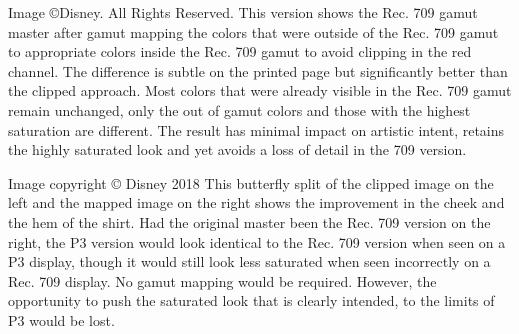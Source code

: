 Image ©Disney. All Rights Reserved.
This version shows the Rec. 709 gamut master after gamut mapping the colors that were outside of the Rec. 709 gamut to appropriate colors inside the Rec. 709 gamut to avoid clipping in the red channel. The difference is subtle on the printed page but significantly better than the clipped approach. Most colors that were already visible in the Rec. 709 gamut remain unchanged, only the out of gamut colors and those with the highest saturation are different. The result has minimal impact on artistic intent, retains the highly saturated look and yet avoids a loss of detail in the 709 version. 


Image copyright © Disney 2018
This butterfly split of the clipped image on the left and the mapped image on the right shows the improvement in the cheek and the hem of the shirt. Had the original master been the Rec. 709 version on the right, the P3 version would look identical to the Rec. 709 version when seen on a P3 display, though it would still look less saturated when seen incorrectly on a Rec. 709 display. No gamut mapping would be required. However, the opportunity to push the saturated look that is clearly intended, to the limits of P3 would be lost.

